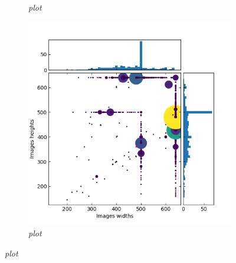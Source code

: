 \documentclass{article}
\begin{document}
        \begin{figure}[!ht]
            \begin{subfigure}{.49\linewidth}
                \centering
                \caption{\textit{plot}}
            \end{subfigure}
            \begin{subfigure}{.49\linewidth}
                \centering
                \includegraphics[width=\linewidth]{pics/val2017full.png}
                \caption{\textit{plot}}
            \end{subfigure}

            \bigskip


\end{figure}
\end{document}
